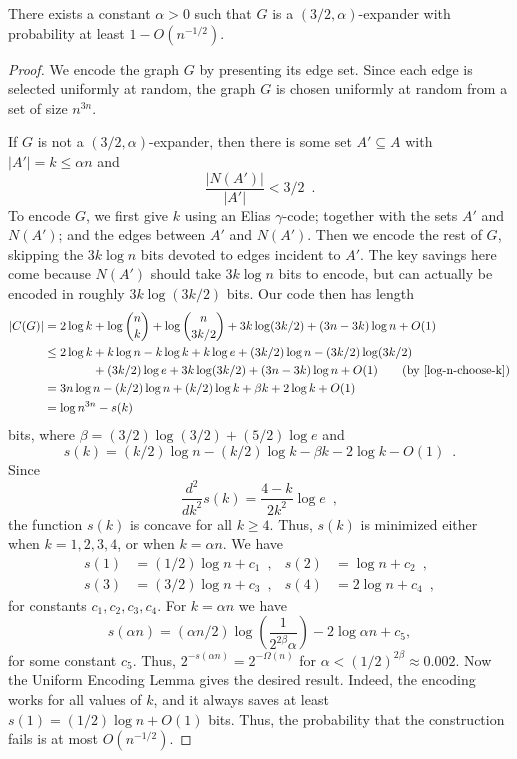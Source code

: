 \documentclass[prodmode,acmcsur]{acmsmall}
\begin{document}
\begin{thm}
  There exists a constant $\alpha >0$ such that $G$ is a
  $(3/2,\alpha)$-expander with probability at least $1 - O(n^{-1/2})$.
\end{thm}

\begin{proof}
  We encode the graph $G$ by presenting its edge set. Since each edge
  is selected uniformly at random, the graph $G$ is chosen uniformly at
  random from a set of size $n^{3n}$.
  
  If $G$ is not a $(3/2, \alpha)$-expander, then there is some set $A'
  \subseteq A$ with $|A'|=k\le \alpha n$ and
  \[
  \frac{|N(A')|}{|A'|} < 3/2 \enspace .
  \]
  To encode $G$, we first give $k$ using an Elias $\gamma$-code; together 
  with the sets $A'$ and $N(A')$; and the edges between $A'$ and
  $N(A')$. Then we encode the rest of $G$, skipping the $3k\log n$
  bits devoted to edges incident to $A'$.  The key savings here come 
  because
  $N(A')$ should take $3k\log n$ bits to encode, but can actually be
  encoded in roughly $3k\log(3k/2)$ bits. Our code then has length
  \begin{align*}
    |C(G)| &= 2\log k + \log {n \choose k} + \log {n \choose 3k/2} + 3k \log (3k/2) + (3n - 3k) \log n + O(1) \\
           &\le 2\log k + k\log n - k\log k + k\log e + (3k/2)\log n - (3k/2) \log (3k/2) \\
           & \hphantom{{}=2\log k} + (3k/2) \log e + 3k \log (3k/2) + (3n - 3k) \log n + O(1) \tag{by \eqref{log-n-choose-k}} \\
           &= 3n\log n - (k/2)\log n + (k/2)\log k + \beta k + 2\log k + O(1) \\
           &= \log n^{3n} - s(k)
  \end{align*}
  bits, where $\beta = (3/2) \log (3/2) + (5/2) \log e$ and
  \[
  s(k) = (k/2)\log n - (k/2)\log k - \beta k -
  2 \log k - O(1) \enspace.
  \]
  Since
  \[
    \frac{d^2}{dk^2} s(k) = \frac{4 - k}{2 k^2} \log e \enspace ,
  \]
  the function $s(k)$ is concave for all $k \geq 4$. Thus, $s(k)$ is
  minimized either when $k = 1, 2, 3, 4$, or when $k = \alpha n$. We have
  \begin{align*}
    s(1) &= (1/2)\log n + c_1 \enspace , & 
    s(2) &= \log n + c_2 \enspace , \\
    s(3) &= (3/2) \log n + c_3 \enspace , &
    s(4) &= 2 \log n + c_4 \enspace ,
  \end{align*}
  for constants $c_1, c_2, c_3, c_4$. For $k=\alpha n$ we have
  \[
    s(\alpha n) = (\alpha n/2)\log \left(\frac{1}{2^{2\beta}
        \alpha}\right) - 2 \log \alpha n + c_5,
  \]
  for some constant $c_5$.
  Thus, $2^{-s(\alpha n)} = 2^{-\varOmega(n)}$ for
  $\alpha < (1/2)^{2\beta} \approx 0.002$. Now the Uniform Encoding
  Lemma gives the desired result. Indeed, the encoding works
  for all values of $k$, and it always saves at least 
  $s(1) = (1/2)\log n + O(1)$ bits.
  Thus, the probability that the construction fails is
  at most $O(n^{-1/2})$.
\end{proof}
\end{document}

